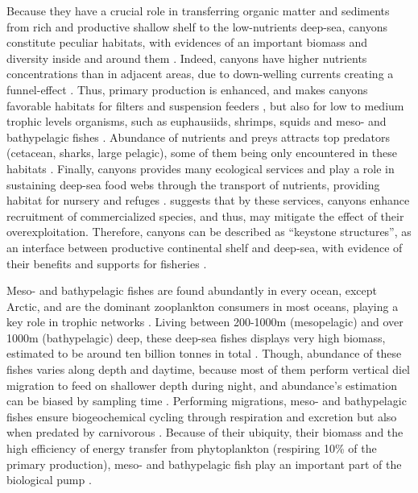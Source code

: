 Because they have a crucial role in transferring organic matter and sediments from rich and productive shallow shelf to the low-nutrients deep-sea, canyons constitute peculiar habitats, with evidences of an important biomass and diversity inside and around them \citep{canals2006,danovaro2009,deleo2012,sion2019,stefanescu1994}. Indeed, canyons have higher nutrients concentrations than in adjacent areas, due to down-welling currents creating a funnel-effect \citep{fernandez-arcaya2017}. Thus, primary production is enhanced, and makes canyons favorable habitats for filters and suspension feeders \citep{fernandez-arcaya2017,sion2019}, but also for low to medium trophic levels organisms, such as euphausiids, shrimps, squids and meso- and bathypelagic fishes \citep{aissi2012,gaskett2001,pusch2004}. Abundance of nutrients and preys attracts top predators (cetacean, sharks, large pelagic), some of them being only encountered in these habitats \citep{aissi2012}. Finally, canyons provides many ecological services and play a role in sustaining deep-sea food webs through the transport of nutrients, providing habitat for nursery and refuges \citep{fernandez-arcaya2017}. \citet{company2008} suggests that by these services, canyons enhance recruitment of commercialized species, and thus, may mitigate the effect of their overexploitation. Therefore, canyons can be described as ``keystone structures'', as an interface between productive continental shelf and deep-sea, with evidence of their benefits and supports for fisheries \citep{company2012,fernandez-arcaya2017}.

Meso- and bathypelagic fishes are found abundantly in every ocean, except Arctic, and are the dominant zooplankton consumers in most oceans, playing a key role in trophic networks \citep{davison2015,salvanes2009}. Living between 200-1000m (mesopelagic) and over 1000m (bathypelagic) deep, these deep-sea fishes displays very high biomass, estimated to be around ten billion tonnes in total \citep{garcia2021,gjoesaeter1980,richards2019}. Though, abundance of these fishes varies along depth and daytime, because most of them perform vertical diel migration to feed on shallower depth during night, and abundance's estimation can be biased by sampling time \citep{catul2011,gaskett2001,garcia2021,pusch2004,salvanes2009}. Performing migrations, meso- and bathypelagic fishes ensure biogeochemical cycling through respiration and excretion but also when predated by carnivorous \citep{garcia2021,spitz2019}. Because of their ubiquity, their biomass and the high efficiency of energy transfer from phytoplankton (respiring 10\% of the primary production), meso- and bathypelagic fish play an important part of the biological pump \citep{garcia2021,spitz2019}.

